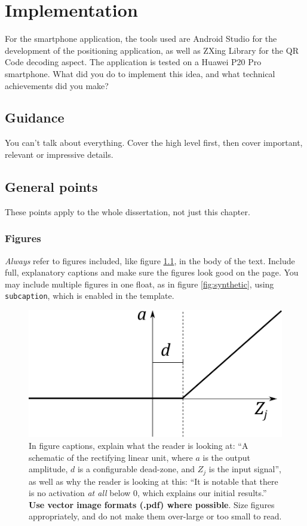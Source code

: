\documentclass{l4proj}
\begin{document}
\chapter{Implementation}
For the smartphone application, the tools used are Android Studio for the development of the positioning application, as well as ZXing Library for the QR Code decoding aspect. The application is tested on a Huawei P20 Pro smartphone.
What did you do to implement this idea, and what technical achievements did you make?
\section{Guidance}
You can't talk about everything. Cover the high level first, then cover important, relevant or impressive details.



\section{General points}

These points apply to the whole dissertation, not just this chapter.



\subsection{Figures}
\emph{Always} refer to figures included, like figure \ref{fig:relu}, in the body of the text. Include full, explanatory captions and make sure the figures look good on the page.
You may include multiple figures in one float, as in figure \ref{fig:synthetic}, using \texttt{subcaption}, which is enabled in the template.



\begin{figure}
    \centering
    \includegraphics[width=0.5\linewidth]{images/relu.pdf}    

    \caption{In figure captions, explain what the reader is looking at: ``A schematic of the rectifying linear unit, where $a$ is the output amplitude,
    $d$ is a configurable dead-zone, and $Z_j$ is the input signal'', as well as why the reader is looking at this: 
    ``It is notable that there is no activation \emph{at all} below 0, which explains our initial results.'' 
    \textbf{Use vector image formats (.pdf) where possible}. Size figures appropriately, and do not make them over-large or too small to read.
    }

    \label{fig:relu} 
\end{figure}
\end{document}
